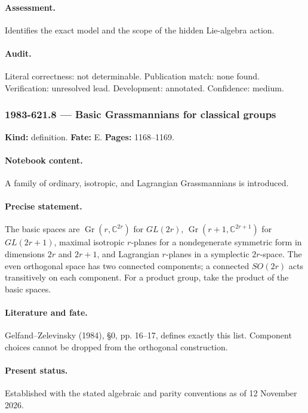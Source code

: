 \paragraph{Assessment.} Identifies the exact model and the scope of the hidden Lie-algebra action.

\paragraph{Audit.} Literal correctness: not determinable. Publication match: none found. Verification: unresolved lead. Development: annotated. Confidence: medium.

\subsubsection{1983-621.8 --- Basic Grassmannians for classical groups}

\label{item:1983-621.8}

\noindent\textbf{Kind:} definition. \textbf{Fate:} E. \textbf{Pages:} 1168--1169.\par

\paragraph{Notebook content.} A family of ordinary, isotropic, and Lagrangian Grassmannians is introduced.

\paragraph{Precise statement.} The basic spaces are \(\operatorname{Gr}(r,\mathbb C^{2r})\) for \(GL(2r)\), \(\operatorname{Gr}(r+1,\mathbb C^{2r+1})\) for \(GL(2r+1)\), maximal isotropic \(r\)-planes for a nondegenerate symmetric form in dimensions \(2r\) and \(2r+1\), and Lagrangian \(r\)-planes in a symplectic \(2r\)-space. The even orthogonal space has two connected components; a connected \(SO(2r)\) acts transitively on each component. For a product group, take the product of the basic spaces.

\paragraph{Literature and fate.} Gelfand–Zelevinsky (1984), \S0, pp. 16–17, defines exactly this list. Component choices cannot be dropped from the orthogonal construction.

\paragraph{Present status.} Established with the stated algebraic and parity conventions as of 12 November 2026.


